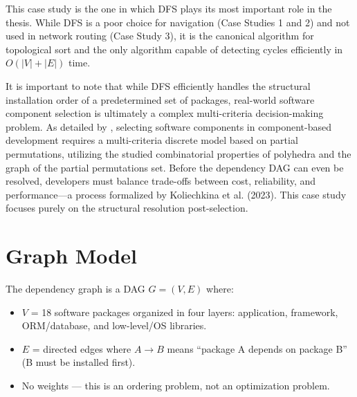 \documentclass[12pt, a4paper, oneside]{report}
\theoremstyle{definition}
\begin{document}
This case study is the one in which DFS plays its most important role in the thesis. While DFS is a poor choice for navigation (Case Studies 1 and 2) and not used in network routing (Case Study 3), it is the canonical algorithm for topological sort and the only algorithm capable of detecting cycles efficiently in $O(|V|+|E|)$ time. 

It is important to note that while DFS efficiently handles the structural installation order of a predetermined set of packages, real-world software component selection is ultimately a complex multi-criteria decision-making problem. As detailed by \citet{koliechkina2023}, selecting software components in component-based development requires a multi-criteria discrete model based on partial permutations, utilizing the studied combinatorial properties of polyhedra and the graph of the partial permutations set. Before the dependency DAG can even be resolved, developers must balance trade-offs between cost, reliability, and performance—a process formalized by Koliechkina et al. (2023). This case study focuses purely on the structural resolution post-selection.

\section{Graph Model}

The dependency graph is a DAG $G = (V, E)$ where:
\begin{itemize}
    \item $V$ = 18 software packages organized in four layers: application, framework, ORM/database, and low-level/OS libraries.
    \item $E$ = directed edges where $A \to B$ means ``package A depends on package B'' (B must be installed first).
    \item No weights — this is an ordering problem, not an optimization problem.
\end{itemize}
\end{document}
